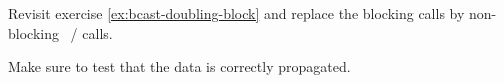   \label{ex:bcast-doubling-nonblock}
  Revisit exercise \ref{ex:bcast-doubling-block} and replace the
  blocking calls by non-blocking ~/  calls.

  Make sure to test that the data is correctly propagated.
